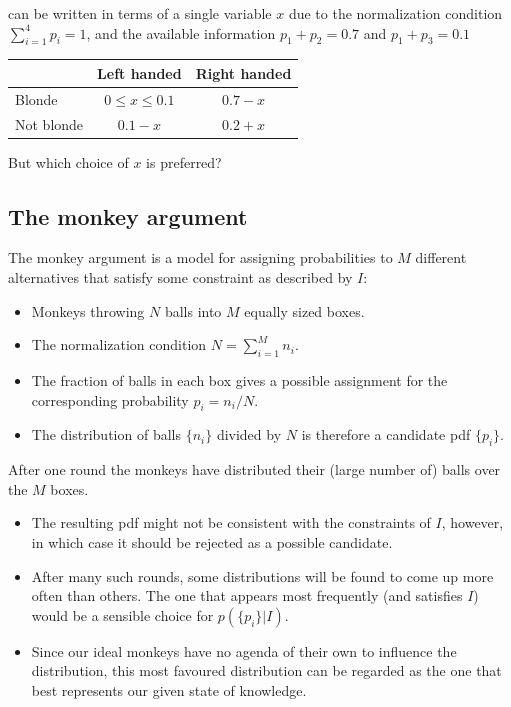 \documentclass[%
oneside,                 %
final,                   %
10pt]{article}
\begin{document}
can be written in terms of a single variable $x$ due to the normalization condition $\sum_{i=1}^4 p_i = 1$, and the available information $p_1 + p_2 = 0.7$ and $p_1 + p_3 = 0.1$


\vspace{3mm}





\begin{tabular}{lcc}
\hline
\multicolumn{1}{c}{  } & \multicolumn{1}{c}{ Left handed } & \multicolumn{1}{c}{ Right handed } \\
\hline
Blonde     & $0 \le x \le 0.1$ & $0.7-x$      \\
Not blonde & $0.1-x$           & $0.2+x$      \\
\hline
\end{tabular}


\noindent


\vspace{3mm}


But which choice of $x$ is preferred?

\subsection{The monkey argument}

The monkey argument is a model for assigning probabilities to $M$ different alternatives that satisfy some constraint as described by $I$: 
\begin{itemize}
\item Monkeys throwing $N$ balls into $M$ equally sized boxes.

\item The normalization condition $N = \sum_{i=1}^M n_i$.

\item The fraction of balls in each box gives a possible assignment for the corresponding probability $p_i = n_i / N$.

\item The distribution of balls $\{ n_i \}$ divided by $N$ is therefore a candidate pdf $\{ p_i \}$.
\end{itemize}

\noindent
After one round the monkeys have distributed their (large number of) balls over the $M$ boxes.
\begin{itemize}
\item The resulting pdf might not be consistent with the constraints of $I$, however, in which case it should be rejected as a possible candidate.

\item After many such rounds, some distributions will be found to come up more often than others. The one that appears most frequently (and satisfies $I$) would be a sensible choice for $p(\{p_i\}|I)$.

\item Since our ideal monkeys have no agenda of their own to influence the distribution, this most favoured distribution can be regarded as the one that best represents our given state of knowledge.
\end{itemize}
\end{document}
